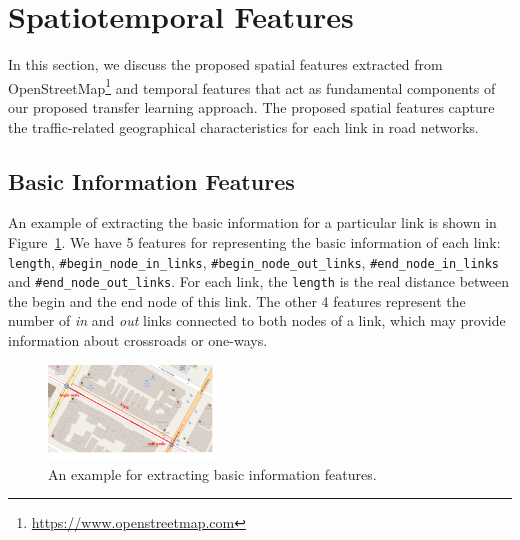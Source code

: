\section{Spatiotemporal Features}
In this section, we discuss the proposed spatial features extracted from OpenStreetMap\footnote{\url{https://www.openstreetmap.com}} and temporal features that act as fundamental components of our proposed transfer learning approach. 
The proposed spatial features capture the traffic-related geographical characteristics for each link in road networks.

\subsection{Basic Information Features} 
An example of extracting the basic information for a particular link is shown in Figure~\ref{fig:basic}.
We have 5 features for representing the basic information of each link: 
\texttt{length}, \texttt{\#begin\_node\_in\_links}, \texttt{\#begin\_node\_out\_links}, \texttt{\#end\_node\_in\_links} and \texttt{\#end\_node\_out\_links}.
For each link, the \texttt{length} is the real distance between the begin and the end node of this link. 
The other 4 features represent the number of \textit{in} and \textit{out} links connected to both nodes of a link, which may provide information about crossroads or one-ways.

\begin{figure}[th]
	\centering
	\includegraphics[width=0.4\textwidth]{figures/basic.pdf}
	\caption{An example for extracting basic information features.}
	\label{fig:basic}
\end{figure}
